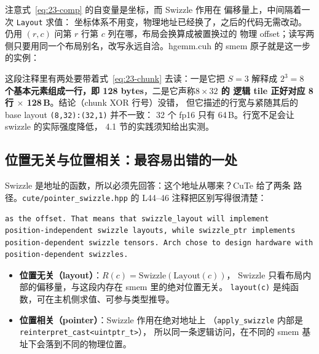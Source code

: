 注意式~\eqref{eq:23-comp} 的自变量是坐标，而 Swizzle 作用在
偏移量上，中间隔着一次 \texttt{Layout} 求值：
坐标体系不用变，物理地址已经换了，之后的代码无需改动。
仍用 $(r,c)$ 问第 $r$ 行第 $c$ 列在哪，布局会换算成被置换过的
物理 offset；读写两侧只要用同一个布局别名，改写永远自洽。hgemm.cuh 的
smem 原子就是这一步的实例：



这段注释里有两处要带着式~\eqref{eq:23-chunk} 去读：一是它把 $S=3$ 解释成
\textbf{$2^3=8$ 个基本元素组成一行，即 128 bytes}，二是它声称\textbf{$8\times32$ 的
逻辑 tile 正好对应 8 行 $\times$ 128\,B}。结论（chunk XOR 行号）没错，
但它描述的行宽与紧随其后的 base layout \texttt{\allowbreak{}(8,\allowbreak{}32):\allowbreak{}(32,\allowbreak{}1)} 并不一致：
32 个 fp16 只有 64\,B。行宽不足会让 swizzle 的实际强度降低，
4.1 节的实践须知给出实测。

\subsection{位置无关与位置相关：最容易出错的一处}

Swizzle 是地址的函数，所以必须先回答：这个地址从哪来？CuTe 给了两条
路径。\texttt{cute/\allowbreak{}pointer\_\allowbreak{}swizzle.\allowbreak{}hpp} 的 L44--46 注释把区别写得很清楚：

\begin{lstlisting}[style=console]
as the offset. That means that swizzle_layout will implement
position-independent swizzle layouts, while swizzle_ptr implements
position-dependent swizzle tensors. Arch chose to design hardware with
position-dependent swizzles.
\end{lstlisting}

\begin{itemize}[leftmargin=2em]
\item \textbf{位置无关（layout）}：$R(c)=\text{Swizzle}(\text{Layout}(c))$，
Swizzle 只看布局内部的偏移量，与这段内存在 smem 里的绝对位置无关。
\texttt{layout(c)} 是纯函数，可在主机侧求值、可参与类型推导。
\item \textbf{位置相关（pointer）}：Swizzle 作用在绝对地址上
（\texttt{apply\_\allowbreak{}swizzle} 内部是 \texttt{reinterpret\_\allowbreak{}cast\allowbreak{}<uintptr\_\allowbreak{}t>}），
所以同一条逻辑访问，在不同的 smem 基址下会落到不同的物理位置。
\end{itemize}

